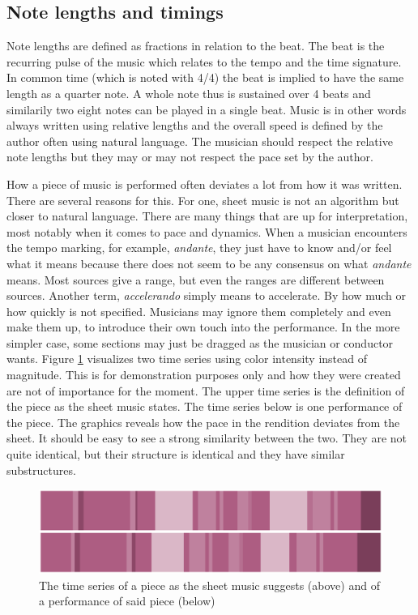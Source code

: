 \subsection{Note lengths and timings}
Note lengths are defined as fractions in relation to the beat. The beat is the recurring pulse of the music which relates to the tempo and the time signature. In common time (which is noted with 4/4) the beat is implied to have the same length as a quarter note. A whole note thus is sustained over 4 beats and similarily two eight notes can be played in a single beat. Music is in other words always written using relative lengths and the overall speed is defined by the author often using natural language. The musician should respect the relative note lengths but they may or may not respect the pace set by the author.  


How a piece of music is performed often deviates a lot from how it was written. There are several reasons for this. For one, sheet music is not an algorithm but closer to natural language. There are many things that are up for interpretation, most notably when it comes to pace and dynamics. When a musician encounters the tempo marking, for example, \textit{andante}, they just have to know and/or feel what it means because there does not seem to be any consensus on what \textit{andante} means. Most sources give a range, but even the ranges are different between sources. Another term, \textit{accelerando} simply means to accelerate. By how much or how quickly is not specified. Musicians may ignore them completely and even make them up, to introduce their own touch into the performance. In the more simpler case, some sections may just be dragged as the musician or conductor wants. Figure \ref{fig:performance-sheet} visualizes two time series using color intensity instead of magnitude. This is for demonstration purposes only and how they were created are not of importance for the moment. The upper time series is the definition of the piece as the sheet music states. The time series below is one performance of the piece. The graphics reveals how the pace in the rendition deviates from the sheet. It should be easy to see a strong similarity between the two. They are not quite identical, but their structure is identical and they have similar substructures. 

\begin{figure}[ht]
    \centering
    \includegraphics[width=\textwidth]{./images/performance-sheet.png}
    \caption{The time series of a piece as the sheet music suggests (above) and of a performance of said piece (below)\label{fig:performance-sheet}}
\end{figure}

